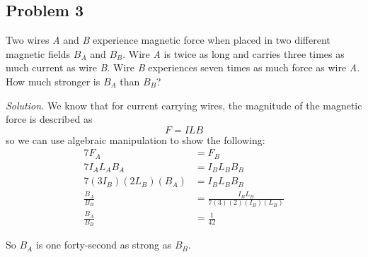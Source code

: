 \documentclass{article}
\begin{document}
	\subsection{Problem 3}
	Two wires \textit{A} and \textit{B} experience magnetic force when placed in two different magnetic fields $B_A$ and $B_B$. Wire \textit{A} is twice as long and carries three times as much current as wire \textit{B}. Wire \textit{B} experiences seven times as much force as wire \textit{A}. How much stronger is $B_A$ than $B_B$?
	
	\textit{Solution.}
	We know that for current carrying wires, the magnitude of the magnetic force is described as 
	$$ F = ILB $$
	so we can use algebraic manipulation to show the following:
	\begin{equation*}
	\begin{split}
	7F_A & = F_B \\
	7I_A L_A B_A & = I_B L_B B_B \\
	7(3I_B)(2L_B)(B_A) & = I_B L_B B_B \\
	\frac{B_A}{B_B} & = \frac{I_B L_B}{7(3)(2)(I_B)(L_B)} \\
	\frac{B_A}{B_B} & = \frac{1}{42}
	\end{split}
	\end{equation*}
	
	So $B_A$ is one forty-second as strong as $B_B$.
	
	
	
	
	
	
\end{document}
